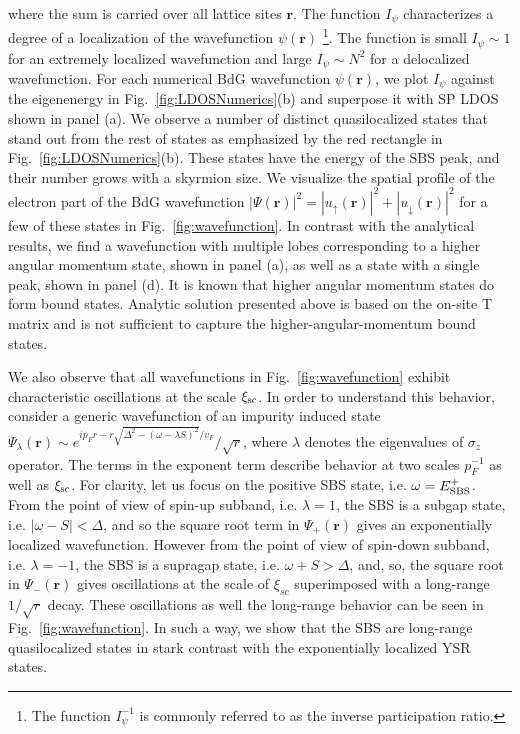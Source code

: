 \documentclass[twocolumn,showpacs,floatfix,longbibliography]{revtex4-1}
\begin{document}
where the sum is carried over all lattice sites $\bm r$. The function $I_\psi$ characterizes a degree of a localization of the wavefunction $\psi(\bm r)$ \footnote{The function $I_\psi^{-1}$ is commonly referred to as the inverse participation ratio.}. The function is small $I_\psi \sim 1$ for an extremely localized wavefunction and large $I_\psi \sim N^2$ for a delocalized wavefunction. For each numerical BdG wavefunction $\psi(\bm r)$, we plot $I_\psi$ against the eigenenergy in Fig.~\ref{fig:LDOSNumerics}(b) and superpose it with SP LDOS shown in panel (a). We observe a number of distinct quasilocalized states that stand out from the rest of states as emphasized by the red rectangle in Fig.~\ref{fig:LDOSNumerics}(b). These states have the energy of the SBS peak, and their number grows with a skyrmion size. We visualize the spatial profile of the electron part of the BdG wavefunction $|\Psi(\bm r)|^2 = |u_{\uparrow}(\bm r)|^2+|u_{\downarrow}(\bm r)|^2$  for a few of these states in Fig.~\ref{fig:wavefunction}. In contrast with the analytical results, we find a wavefunction with multiple lobes corresponding to a higher angular momentum state, shown in panel (a), as well as a state with a single peak, shown in panel (d). It is known that higher angular momentum states do form bound states. Analytic solution presented above is based on the on-site T matrix and is not sufficient to capture the higher-angular-momentum bound states.

We also observe that all wavefunctions in Fig.~\ref{fig:wavefunction} exhibit characteristic oscillations at the scale $\xi_{\rm sc}$. In order to understand this behavior, consider a generic wavefunction of an impurity induced state ${\Psi_\lambda(\bm r) \sim e^{ip_Fr-r\sqrt{\Delta^2-(\omega - \lambda S)^2}/v_F}/\sqrt{r}}$, where $\lambda$ denotes the eigenvalues of $\sigma_z$ operator. The terms in the exponent term describe behavior at two scales $p_F^{-1}$ as well as $\xi_{\rm sc}$. For clarity, let us focus on the positive SBS state, i.e. $\omega = E^{+}_{\rm SBS}$. From the point of view of spin-up subband, i.e. $\lambda = 1$, the SBS is a subgap state, i.e. $|\omega- S|<\Delta$, and so the square root term in $\Psi_+(\bm r)$ gives an exponentially localized wavefunction. However from the point of view of spin-down subband, i.e. $\lambda = -1$, the SBS is a supragap state, i.e. $\omega+S>\Delta$, and, so, the square root in $\Psi_-(\bm r)$ gives oscillations  at the scale of $\xi_{sc}$ superimposed with a long-range $1/\sqrt{r}$ decay. These oscillations as well the long-range behavior can be seen in Fig.~\ref{fig:wavefunction}. In such a way, we show that the SBS are long-range quasilocalized states in stark contrast with the exponentially localized YSR states.
\end{document}
